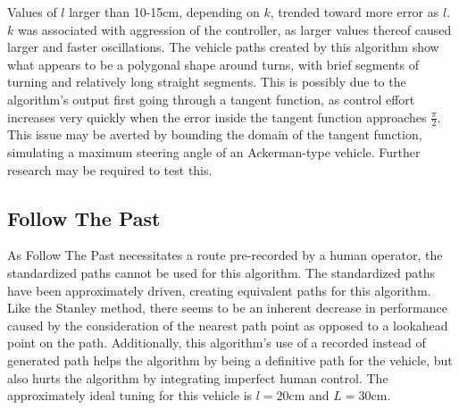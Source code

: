 \documentclass[mla8alt]{mla}
\begin{document}
\begin{paper}
\begin{figure}[H]
\endminipage
\end{figure}

Values of $l$ larger than 10-15cm, depending on $k$, trended toward more error as $l$. $k$ was associated with aggression of the controller, as larger values thereof caused larger and faster oscillations. The vehicle paths created by this algorithm show what appears to be a polygonal shape around turns, with brief segments of turning and relatively long straight segments. This is possibly due to the algorithm's output first going through a tangent function, as control effort increases very quickly when the error inside the tangent function approaches $\frac{\pi}{2}$. This issue may be averted by bounding the domain of the tangent function, simulating a maximum steering angle of an Ackerman-type vehicle. Further research may be required to test this.

\subsection{Follow The Past}

As Follow The Past necessitates a route pre-recorded by a human operator, the standardized paths cannot be used for this algorithm. The standardized paths have been approximately driven, creating equivalent paths for this algorithm. Like the Stanley method, there seems to be an inherent decrease in performance caused by the consideration of the nearest path point as opposed to a lookahead point on the path. Additionally, this algorithm's use of a recorded instead of generated path helps the algorithm by being a definitive path for the vehicle, but also hurts the algorithm by integrating imperfect human control. The approximately ideal tuning for this vehicle is $l=20$cm and $L=30$cm.


\end{paper}
\end{document}
